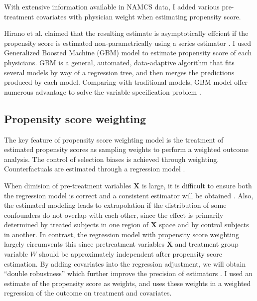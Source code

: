 With extensive information available in NAMCS data, I added various pre-treatment covariates with physician weight when estimating propensity score.   

Hirano et al. claimed that the resulting estimate is asymptotically effcient if the propensity score is estimated non-parametrically using a series estimator \citep{hirano2003efficient}. I used Generalized Boosted Machine (GBM) model to estimate propensity score of each physicians. GBM is a general, automated, data-adaptive algorithm that fits several models by way of a regression tree, and then merges the predictions produced by each model. Comparing with traditional models, GBM model offer numerous advantage to solve the variable specification problem \citep{guo2009propensity}. 

\subsection{Propensity score weighting}
The key feature of propensity score weighting model is the treatment of estimated propensity scores as sampling weights to perform a weighted outcome analysis. The control of selection biases is achieved through weighting. Counterfactuals are estimated through a regression model \citep{guo2009propensity}.

When dimision of pre-treatment variables $\textbf{X}$ is large, it is difficult to ensure both the regression model is correct and a consistent estimator will be obtained \citep{rubin1997estimating}. Also, the estimated modeling leads to extrapolation if the distribution of some confounders do not overlap with each other, since the effect is primarily determined by treated subjects in one region of $\textbf{X}$ space and by control subjects in another. In contrast, the regression model with propensity score weighting largely circumvents this since pretreatment variables $\textbf{X}$ and treatment group variable $W$ should be approximately independent after propensity score estimation. By adding covariates into the regression adjustment, we will obtain ``double robustness'' which further improve the precision of estimators \citep{lunceford2004stratification}. I used an estimate of the propensity score as weights, and uses these weights in a weighted regression of the outcome on treatment and covariates.
